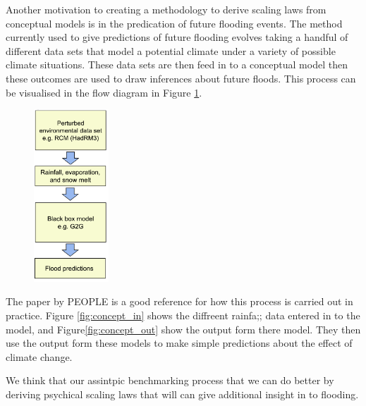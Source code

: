 \documentclass[11pt]{article}
\begin{document}
\begin{minipage}{0.45\textwidth}
    Another motivation to creating a methodology to derive scaling laws from conceptual models is in the predication of future flooding events. 
    The method currently used to give predictions of future flooding evolves taking a handful of different data sets that model a potential climate under a variety of possible climate situations. These data sets are then feed in to a conceptual model then these outcomes are used to draw inferences about future floods.
    This process can be visualised in the flow diagram in Figure \ref{fig:flow}.
\end{minipage}
\hspace{0.05\textwidth}
\begin{minipage}{0.45\textwidth}
    \begin{figure}[H]
    \centering
    \includegraphics[width=0.25\textwidth]{Figs/flow.png}
    \label{fig:flow}
\end{figure}
\end{minipage}
\vspace{5pt}

The paper by PEOPLE is a good reference for how this process is carried out in practice. Figure \ref{fig:concept_in} shows the diffreent rainfa;; data entered in to the model, and Figure\ref{fig:concept_out} show the output form there model. They then use the output form these models to make simple predictions about the effect of climate change.

We think that our assintpic benchmarking process that we can do better by deriving psychical scaling laws that will can give additional insight in to flooding.
\end{document}
